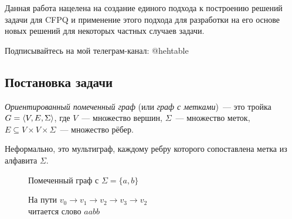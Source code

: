 Данная работа нацелена на создание единого подхода к построению решений задачи для CFPQ и применение этого подхода для разработки на его основе новых решений для некоторых частных случаев задачи.

{\color{white} Подписывайтесь на мой телеграм-канал: @hehtable}

\pagebreak

\subsection*{Постановка задачи}

\begin{definition}
  \textit{Ориентированный помеченный граф} (или \textit{граф с метками})~--- это тройка $G = \langle V, E, \Sigma \rangle$, где $V$~--- множество вершин, $\Sigma$~--- множество меток, \\$E \subseteq V \times V \times \Sigma$~--- множество рёбер. 

  Неформально, это мультиграф, каждому ребру которого сопоставлена метка из алфавита $\Sigma$.
\end{definition}

\begin{figure}[h]
  \begin{minipage}[h]{0.5\linewidth}
    \centering
    \caption{Помеченный граф с $\Sigma = \{ a, b \}$}
  \end{minipage}
  \hfill
  \begin{minipage}[h]{0.5\linewidth} 
    \centering
    \caption{На пути $v_0 \to v_1 \to v_2 \to v_3 \to v_2$\\ читается слово $aabb$}
  \end{minipage}
\end{figure}


